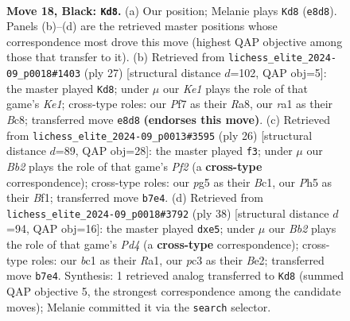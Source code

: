 \documentclass[11pt]{article}
\begin{document}
\clearpage

\begin{figure}[p]\centering
\begin{subfigure}{0.46\textwidth}\centering
\resizebox{\linewidth}{!}{%
\newchessgame
\chessboard[
  setfen={2r1kbnr/1b3pp1/pq1P4/2p3Pp/2p2P1P/2P4R/PP2Q3/RNB1K2B b Qk - 1 18},
  showmover=false,
  pgfstyle=straightmove, color=movearrow, markmove={e8-d8}
]}
\caption{}
\end{subfigure}\hfill
\begin{subfigure}{0.46\textwidth}\centering
\resizebox{\linewidth}{!}{%
\newchessgame
\chessboard[
  setfen={r1b1k2r/2p1bp1p/p4p2/3qp3/1p2N3/1P1P1Q2/1PP2PPP/R1B1K2R b KQkq - 3 14},
  showmover=false,
  pgfstyle=straightmove, color=movearrow, markmove={e8-d8}
]}
\caption{}
\end{subfigure}
\\[4pt]
\begin{subfigure}{0.46\textwidth}\centering
\resizebox{\linewidth}{!}{%
\newchessgame
\chessboard[
  setfen={rn2k2r/pp3ppp/2p1p1b1/3qP2P/Q5P1/2P5/P3PP2/R1B1KB1R w KQkq - 1 14},
  showmover=false,
  pgfstyle=straightmove, color=movearrow, markmove={f2-f3}
]}
\caption{}
\end{subfigure}\hfill
\begin{subfigure}{0.46\textwidth}\centering
\resizebox{\linewidth}{!}{%
\newchessgame
\chessboard[
  setfen={2rr2k1/pp1n1pbp/2p3p1/4p3/1P1PP3/q3B1PP/P1Q1BP2/R3R1K1 w - - 2 20},
  showmover=false,
  pgfstyle=straightmove, color=movearrow, markmove={d4-e5}
]}
\caption{}
\end{subfigure}
\caption{\textbf{Move 18, Black: \texttt{Kd8}.} (a) Our position; Melanie plays \texttt{Kd8} (\texttt{e8d8}). Panels (b)--(d) are the retrieved master positions whose correspondence most drove this move (highest QAP objective among those that transfer to it). (b) Retrieved from \texttt{lichess\_elite\_2024-09\_p0018\#1403} (ply 27) [structural distance $d$=102, QAP obj=5]: the master played \texttt{Kd8}; under $\mu$ our \emph{Ke1} plays the role of that game's \emph{Ke1}; cross-type roles: our \emph{P}f7 as their \emph{R}a8, our \emph{r}a1 as their \emph{B}c8; transferred move \texttt{e8d8} \textbf{(endorses this move)}. (c) Retrieved from \texttt{lichess\_elite\_2024-09\_p0013\#3595} (ply 26) [structural distance $d$=89, QAP obj=28]: the master played \texttt{f3}; under $\mu$ our \emph{Bb2} plays the role of that game's \emph{Pf2} (a \textbf{cross-type} correspondence); cross-type roles: our \emph{p}g5 as their \emph{B}c1, our \emph{P}h5 as their \emph{B}f1; transferred move \texttt{b7e4}. (d) Retrieved from \texttt{lichess\_elite\_2024-09\_p0018\#3792} (ply 38) [structural distance $d$=94, QAP obj=16]: the master played \texttt{dxe5}; under $\mu$ our \emph{Bb2} plays the role of that game's \emph{Pd4} (a \textbf{cross-type} correspondence); cross-type roles: our \emph{b}c1 as their \emph{R}a1, our \emph{p}c3 as their \emph{B}e2; transferred move \texttt{b7e4}. Synthesis: 1 retrieved analog transferred to \texttt{Kd8} (summed QAP objective 5, the strongest correspondence among the candidate moves); Melanie committed it via the \texttt{search} selector.}
\label{fig:thought-m35}
\end{figure}
\end{document}
